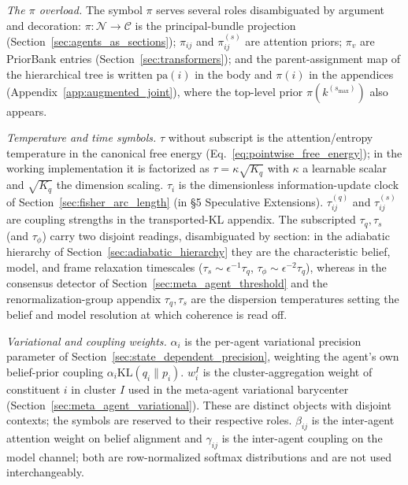 \documentclass[11pt]{article}
\begin{document}
\emph{The $\pi$ overload.} The symbol $\pi$ serves several roles disambiguated by argument and decoration: $\pi: \mathcal{N} \to \mathcal{C}$ is the principal-bundle projection (Section~\ref{sec:agents_as_sections}); $\pi_{ij}$ and $\pi^{(s)}_{ij}$ are attention priors; $\pi_v$ are PriorBank entries (Section~\ref{sec:transformers}); and the parent-assignment map of the hierarchical tree is written $\mathrm{pa}(i)$ in the body and $\pi(i)$ in the appendices (Appendix~\ref{app:augmented_joint}), where the top-level prior $\pi(k^{(s_{\max})})$ also appears.

\emph{Temperature and time symbols.} $\tau$ without subscript is the attention/entropy temperature in the canonical free energy (Eq.~\ref{eq:pointwise_free_energy}); in the working implementation it is factorized as $\tau = \kappa \sqrt{K_q}$ with $\kappa$ a learnable scalar and $\sqrt{K_q}$ the dimension scaling. $\tau_i$ is the dimensionless information-update clock of Section~\ref{sec:fisher_arc_length} (in §5 Speculative Extensions). $\tau^{(q)}_{ij}$ and $\tau^{(s)}_{ij}$ are coupling strengths in the transported-KL appendix. The subscripted $\tau_q, \tau_s$ (and $\tau_\phi$) carry two disjoint readings, disambiguated by section: in the adiabatic hierarchy of Section~\ref{sec:adiabatic_hierarchy} they are the characteristic belief, model, and frame relaxation timescales ($\tau_s \sim \epsilon^{-1}\tau_q$, $\tau_\phi \sim \epsilon^{-2}\tau_q$), whereas in the consensus detector of Section~\ref{sec:meta_agent_threshold} and the renormalization-group appendix $\tau_q, \tau_s$ are the dispersion temperatures setting the belief and model resolution at which coherence is read off.

\emph{Variational and coupling weights.} $\alpha_i$ is the per-agent variational precision parameter of Section~\ref{sec:state_dependent_precision}, weighting the agent's own belief-prior coupling $\alpha_i \mathrm{KL}(q_i \| p_i)$. $w_i^I$ is the cluster-aggregation weight of constituent $i$ in cluster $I$ used in the meta-agent variational barycenter (Section~\ref{sec:meta_agent_variational}). These are distinct objects with disjoint contexts; the symbols are reserved to their respective roles. $\beta_{ij}$ is the inter-agent attention weight on belief alignment and $\gamma_{ij}$ is the inter-agent coupling on the model channel; both are row-normalized softmax distributions and are not used interchangeably.
\end{document}
